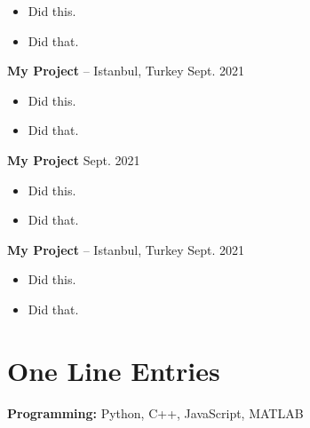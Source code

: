\documentclass[10pt, letterpaper]{article}
\newenvironment{highlights}{
        \begin{itemize}[
                topsep=0pt,
                partopsep=0pt,
                itemsep=0pt,
                leftmargin=10pt
            ]
    }{
        \end{itemize}
    } %
\begin{document}
        \begin{highlights}
        \item Did this.
        \item Did that.
        \end{highlights}


        \vspace{8pt}

        \textbf{My Project} -- Istanbul, Turkey \hfill Sept. 2021

        \begin{highlights}
        \item Did this.
        \item Did that.
        \end{highlights}


        \vspace{8pt}

        \textbf{My Project} \hfill Sept. 2021

        \begin{highlights}
        \item Did this.
        \item Did that.
        \end{highlights}


        \vspace{8pt}

        \textbf{My Project} -- Istanbul, Turkey \hfill Sept. 2021

        \begin{highlights}
        \item Did this.
        \item Did that.
        \end{highlights}



    
    \section{One Line Entries}

        
        \textbf{Pro\textnormal{gram}ming:} Python, C++, JavaScript, MATLAB



    
\end{document}
